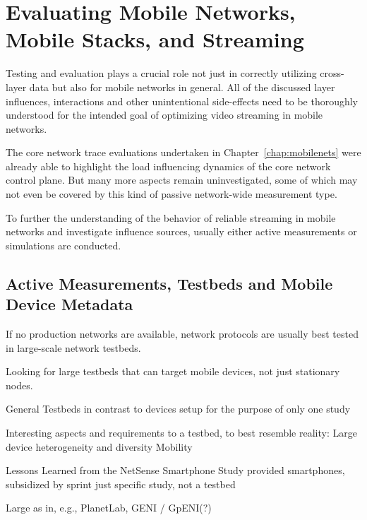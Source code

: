 \chapter{Evaluating Mobile Networks, Mobile Stacks, and Streaming}
\label{chap:mobilestreaming-measurements}

Testing and evaluation plays a crucial role not just in correctly utilizing cross-layer data but also for mobile networks in general. All of the discussed layer influences, interactions and other unintentional side-effects need to be thoroughly understood for the intended goal of optimizing video streaming in mobile networks.

The core network trace evaluations undertaken in Chapter~\ref{chap:mobilenets} were already able to highlight the load influencing dynamics of the core network control plane. But many more aspects remain uninvestigated, some of which may not even be covered by this kind of passive network-wide measurement type.

To further the understanding of the behavior of reliable streaming in mobile networks and investigate influence sources, usually either active measurements or simulations are conducted.




\section{Active Measurements, Testbeds and Mobile Device Metadata}

If no production networks are available, network protocols are usually best tested in large-scale network testbeds.

Looking for large testbeds that can target mobile devices, not just stationary nodes.

General Testbeds in contrast to devices setup for the purpose of only one study

Interesting aspects and requirements to a testbed, to best resemble reality:
Large device heterogeneity and diversity
Mobility

Lessons Learned from the NetSense Smartphone Study \cite{Striegel:2013:LLN:2491159.2491171}
provided smartphones, subsidized by sprint
just specific study, not a testbed

Large as in, e.g., PlanetLab, GENI / GpENI(?)

